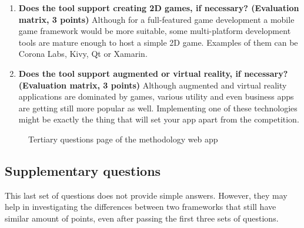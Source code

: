 \documentclass[english,master,public,dept460,male,cpdeclaration,oneside]{diploma}
\begin{document}
\begin{enumerate}
	\item \textbf{Does the tool support creating 2D games, if necessary? (Evaluation matrix, 3 points) }
	Although for a full-featured game development a mobile game framework would be more suitable, some multi-platform development tools are mature enough to host a simple 2D game. Examples of them can be Corona Labs, Kivy, Qt or Xamarin.
	
	\item \textbf{Does the tool support augmented or virtual reality, if necessary? (Evaluation matrix, 3 points) }
	Although augmented and virtual reality applications are dominated by games, various utility and even business apps are getting still more popular as well. Implementing one of these technologies might be exactly the thing that will set your app apart from the competition.
\end{enumerate}


\begin{figure}
	\centering{}
	\caption{Tertiary questions page of the methodology web app}
\end{figure}

\subsection{Supplementary questions}

This last set of questions does not provide simple answers. However, they may help in investigating the differences between two frameworks that still have similar amount of points, even after passing the first three sets of questions.
\end{document}
